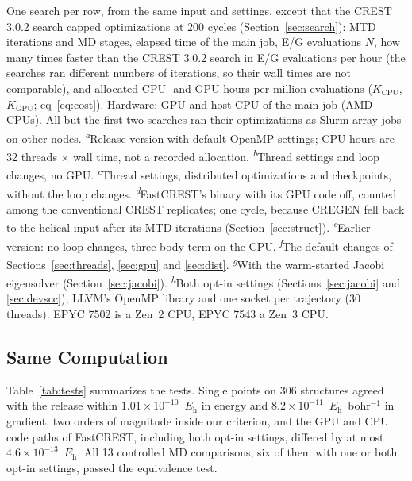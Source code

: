 \documentclass[journal=jctcce,manuscript=article]{achemso}
\newcommand{\Eh}{\ensuremath{E_\mathrm{h}}}
\begin{document}
\begin{table}[tbp]
\smallskip
\begin{minipage}{\textwidth}\raggedright\footnotesize
One search per row, from the same input and settings, except that the CREST 3.0.2 search capped optimizations at 200 cycles (Section~\ref{sec:search}): MTD iterations and MD stages, elapsed time of the main job, E/G evaluations $N$, how many times faster than the CREST 3.0.2 search in E/G evaluations per hour (the searches ran different numbers of iterations, so their wall times are not comparable), and allocated CPU- and GPU-hours per million evaluations ($K_\mathrm{CPU}$, $K_\mathrm{GPU}$; eq~\ref{eq:cost}). Hardware: GPU and host CPU of the main job (AMD CPUs). All but the first two searches ran their optimizations as Slurm array jobs on other nodes. \textsuperscript{\emph{a}}Release version with default OpenMP settings; CPU-hours are 32 threads $\times$ wall time, not a recorded allocation. \textsuperscript{\emph{b}}Thread settings and loop changes, no GPU. \textsuperscript{\emph{c}}Thread settings, distributed optimizations and checkpoints, without the loop changes. \textsuperscript{\emph{d}}FastCREST's binary with its GPU code off, counted among the conventional CREST replicates; one cycle, because CREGEN fell back to the helical input after its MTD iterations (Section~\ref{sec:struct}). \textsuperscript{\emph{e}}Earlier version: no loop changes, three-body term on the CPU. \textsuperscript{\emph{f}}The default changes of Sections~\ref{sec:threads}, \ref{sec:gpu} and \ref{sec:dist}. \textsuperscript{\emph{g}}With the warm-started Jacobi eigensolver (Section~\ref{sec:jacobi}). \textsuperscript{\emph{h}}Both opt-in settings (Sections~\ref{sec:jacobi} and \ref{sec:devscc}), LLVM's OpenMP library and one socket per trajectory (30 threads). EPYC 7502 is a Zen~2 CPU, EPYC 7543 a Zen~3 CPU.
\end{minipage}
\end{table}

\subsection{Same Computation}
\label{sec:same}

Table~\ref{tab:tests} summarizes the tests. Single points on 306 structures agreed with the release within $1.01\times10^{-10}$~\Eh{} in energy and $8.2\times10^{-11}$~\Eh~bohr$^{-1}$ in gradient, two orders of magnitude inside our criterion, and the GPU and CPU code paths of FastCREST, including both opt-in settings, differed by at most $4.6\times10^{-13}$~\Eh. All 13 controlled MD comparisons, six of them with one or both opt-in settings, passed the equivalence test.
\end{document}
